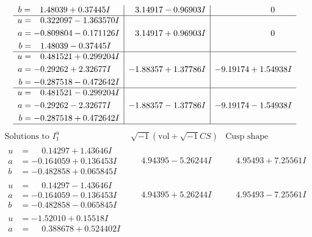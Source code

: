 \documentclass[1p]{elsarticle_modified}
\theoremstyle{definition}
\newcommand{\I}{\sqrt{-1}}
\begin{document}
$$\begin{array}{c|c|c}
\begin{aligned}
b &= \phantom{-}1.48039 + 0.37445 I\end{aligned}
 & \phantom{-}3.14917 - 0.96903 I & \phantom{-0.000000 } 0 \\ \hline\begin{aligned}
u &= \phantom{-}0.322097 - 1.363570 I \\
a &= -0.809804 - 0.171126 I \\
b &= \phantom{-}1.48039 - 0.37445 I\end{aligned}
 & \phantom{-}3.14917 + 0.96903 I & \phantom{-0.000000 } 0 \\ \hline\begin{aligned}
u &= \phantom{-}0.481521 + 0.299204 I \\
a &= -0.29262 + 2.32677 I \\
b &= -0.287518 - 0.472642 I\end{aligned}
 & -1.88357 + 1.37786 I & -9.19174 + 1.54938 I \\ \hline\begin{aligned}
u &= \phantom{-}0.481521 - 0.299204 I \\
a &= -0.29262 - 2.32677 I \\
b &= -0.287518 + 0.472642 I\end{aligned}
 & -1.88357 - 1.37786 I & -9.19174 - 1.54938 I\\
 \hline 
 \end{array}$$\newpage$$\begin{array}{c|c|c}  
\text{Solutions to }I^u_{1}& \I (\text{vol} + \sqrt{-1}CS) & \text{Cusp shape}\\
 \hline 
\begin{aligned}
u &= \phantom{-}0.14297 + 1.43646 I \\
a &= -0.164059 + 0.136453 I \\
b &= -0.482858 + 0.065845 I\end{aligned}
 & \phantom{-}4.94395 - 5.26244 I & \phantom{-}4.95493 + 7.25561 I \\ \hline\begin{aligned}
u &= \phantom{-}0.14297 - 1.43646 I \\
a &= -0.164059 - 0.136453 I \\
b &= -0.482858 - 0.065845 I\end{aligned}
 & \phantom{-}4.94395 + 5.26244 I & \phantom{-}4.95493 - 7.25561 I \\ \hline\begin{aligned}
u &= -1.52010 + 0.15518 I \\
a &= \phantom{-}0.388678 + 0.524402 I \\

\end{aligned}
\end{array}$$
\end{document}
